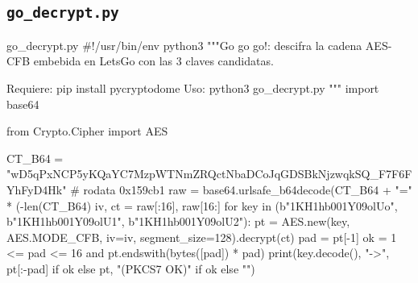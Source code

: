 \documentclass[11pt,a4paper]{article}
\begin{document}
\subsection{\texttt{go\_decrypt.py}}
\begin{codigopython}{go\_decrypt.py}
#!/usr/bin/env python3
"""Go go go!: descifra la cadena AES-CFB embebida en LetsGo con las 3 claves candidatas.

Requiere: pip install pycryptodome
Uso: python3 go_decrypt.py
"""
import base64

from Crypto.Cipher import AES

CT_B64 = "wD5qPxNCP5yKQaYC7MzpWTNmZRQctNbaDCoJqGDSBkNjzwqkSQ_F7F6FYhFyD4Hk"  # rodata 0x159cb1
raw = base64.urlsafe_b64decode(CT_B64 + "=" * (-len(CT_B64) %
iv, ct = raw[:16], raw[16:]
for key in (b"1KH1hb001Y09olUo", b"1KH1hb001Y09olU1", b"1KH1hb001Y09olU2"):
    pt = AES.new(key, AES.MODE_CFB, iv=iv, segment_size=128).decrypt(ct)
    pad = pt[-1]
    ok = 1 <= pad <= 16 and pt.endswith(bytes([pad]) * pad)
    print(key.decode(), "->", pt[:-pad] if ok else pt, "(PKCS7 OK)" if ok else "")
\end{codigopython}
\end{document}
